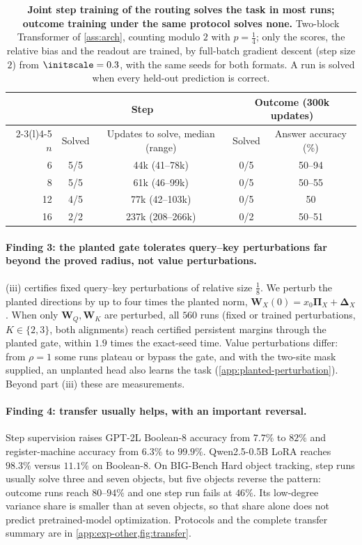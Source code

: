 \begin{table}[t]
\caption{\textbf{Joint step training of the routing solves the task in most runs; outcome training under the same protocol solves
none.} Two-block Transformer of \cref{ass:arch}, counting modulo $2$ with $p=\tfrac{1}{4}$; only the scores, the relative bias and the
readout are trained, by full-batch gradient descent (step size $2$) from $\initscale=0.3$, with the same seeds for both formats. A run is
solved when every held-out prediction is correct.}
\label{tab:reach}
\centering\small
\begin{tabular}{@{}rcccc@{}}
\toprule
 & \multicolumn{2}{c}{Step} & \multicolumn{2}{c}{Outcome (300k updates)}\\
\cmidrule(lr){2-3}\cmidrule(l){4-5}
$n$ & Solved & Updates to solve, median (range) & Solved & Answer accuracy (\%)\\
\midrule
6  & 5/5 & 44k (41--78k)   & 0/5 & 50--94\\
8  & 5/5 & 61k (46--99k)   & 0/5 & 50--55\\
12 & 4/5 & 77k (42--103k)  & 0/5 & 50\\
16 & 2/2 & 237k (208--266k) & 0/2 & 50--51\\
\bottomrule
\end{tabular}
\end{table}

\paragraph{Finding 3: the planted gate tolerates query--key perturbations far beyond the proved radius, not value perturbations.}
(iii) certifies fixed query--key perturbations of relative size $\frac18$. We perturb the planted directions by up to
four times the planted norm, $\mathbf W_X(0)=x_0\bm\Pi_X+\bm\Delta_X$. When only $\mathbf W_Q,\mathbf W_K$ are perturbed, all $560$ runs
(fixed or trained perturbations, $K\in\{2,3\}$, both alignments) reach certified persistent margins through the planted gate, within
$1.9$ times the exact-seed time. Value perturbations differ: from $\rho=1$ some runs plateau or bypass the gate, and with the two-site
mask supplied, an unplanted head also learns the task (\cref{app:planted-perturbation}). Beyond part (iii) these are measurements.

\paragraph{Finding 4: transfer usually helps, with an important reversal.}
Step supervision raises GPT-2L Boolean-8 accuracy from $7.7\%$ to $82\%$ and register-machine
accuracy from $6.3\%$ to $99.9\%$. Qwen2.5-0.5B LoRA reaches $98.3\%$ versus $11.1\%$
on Boolean-8. On BIG-Bench Hard object tracking, step runs usually solve three and seven
objects, but five objects reverse the pattern: outcome runs reach $80$--$94\%$ and one
step run fails at $46\%$. Its low-degree variance share is smaller than at seven objects,
so that share alone does not predict pretrained-model optimization. Protocols and the
complete transfer summary are in \cref{app:exp-other,fig:transfer}.

